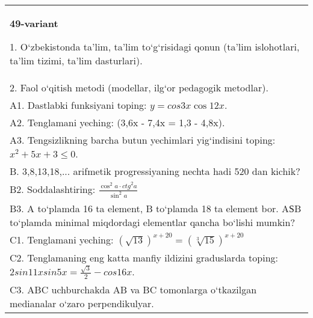 \documentclass{article}
\begin{document}
\begin{tabular}{m{17cm}}
\textbf{49-variant}

1. O‘zbekistonda ta’lim, ta’lim to‘g‘risidagi qonun (ta’lim islohotlari, ta’lim tizimi, ta’lim dasturlari). \\
2. Faol o‘qitish metodi (modellar, ilg‘or pedagogik metodlar). \\
A1. Dastlabki funksiyani toping: \(y=cos{3x}\cos{12x}\). \\
A2. Tenglamani yeching: (3,6x - 7,4x = 1,3 - 4,8x). \\
A3. Tengsizlikning barcha butun yechimlari yig‘indisini toping: \(x^2 + 5x + 3 \leq 0\). \\
B. 3,8,13,18,... arifmetik progressiyaning nechta hadi 520 dan kichik? \\
B2. Soddalashtiring: \(\frac{\cos^{2}a \cdot {ctg}^{2}a}{\sin^{2}a}\) \\
B3. A to‘plamda 16 ta element, B to‘plamda 18 ta element bor. AЅB to‘plamda minimal miqdordagi elementlar qancha bo‘lishi mumkin? \\
C1. Tenglamani yeching: \((\sqrt{13}) ^{x + 20} = (\sqrt[3]{15}) ^{x + 20}\) \\
C2. Tenglamaning eng katta manfiy ildizini graduslarda toping: \(2sin11xsin5x = \frac{\sqrt{3}}{2} - cos16x\). \\
C3. ABC uchburchakda AB va BC tomonlarga o‘tkazilgan medianalar o‘zaro perpendikulyar. \\

\end{tabular}
\vspace{1cm}
\end{document}
